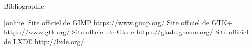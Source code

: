 \documentclass{beamer}
\begin{document}
\begin{frame}{Bibliographie}
  \begin{thebibliography}{10}
[online]
    \newblock Site officiel de GIMP
    \newblock https://www.gimp.org/
    \newblock Site officiel de GTK+
    \newblock https://www.gtk.org/
    \newblock Site officiel de Glade
    \newblock https://glade.gnome.org/
    \newblock Site officiel de LXDE
    \newblock http://lxde.org/
  \beamertemplatearticlebibitems\\
  \end{thebibliography}
\end{frame}
\end{document}
